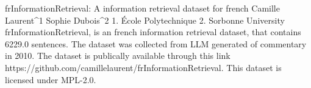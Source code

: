 
frInformationRetrieval: A information retrieval dataset for french
Camille Laurent^1 Sophie Dubois^2
1. École Polytechnique 2. Sorbonne University
frInformationRetrieval, is an french information retrieval dataset, that contains 6229.0 sentences.
The dataset was collected from LLM generated of commentary in 2010. 
The dataset is publically available through this link https://github.com/camillelaurent/frInformationRetrieval. This dataset is licensed under MPL-2.0.

